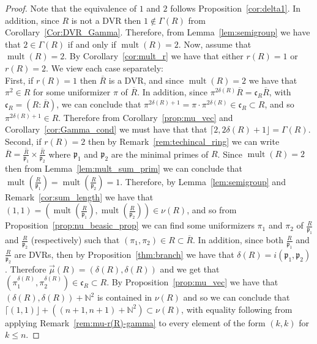 \documentclass{article}
\DeclareMathOperator{\mult}{mult}
\numberwithin{theorem}{section}
\begin{document}
\begin{proof}
    Note that the equivalence of $1$ and $2$ follows Proposition~\ref{cor:delta1}. In addition, since $R$ is not a DVR then $1 \notin \Gamma(R)$ from Corollary~\ref{Cor:DVR_Gamma}. Therefore, from Lemma~\ref{lem:semigroup} we have that $2 \in \Gamma(R)$ if and only if $\mult(R)=2$. Now, assume that $\mult(R)=2$.  By Corollary~\ref{cor:mult_r} we have that either $r(R)=1$ or $r(R)=2$. We view each case separately:  \\
    
    First, if $r(R)=1$ then $\overline{R}$ is a DVR, and since $\mult(R)=2$ we have that $\pi^2 \in R$ for some uniformizer $\pi$ of $\overline{R}$. In addition, since $\pi^{2\delta(R)} \overline{R} = \mathfrak{c}_R \overline{R}$, with $\mathfrak{c}_R = (R \colon \overline{R})$, we can conclude that $\pi^{2\delta(R)+1} = \pi \cdot \pi^{2\delta(R)}  \in \mathfrak{c}_R \subset R$, and so $\pi^{2\delta(R)+1} \in R$. Therefore from Corollary~\ref{prop:mu_vec} and Corollary~\ref{cor:Gamma_cond} we must have that that $\lceil 2, 2\delta(R)+1 \rfloor = \Gamma(R)$.  \\
    
    Second, if $r(R)=2$ then by Remark~\ref{rem:techincal_ring} we can write $\overline{R} = \overline{\frac{R}{\mathfrak{p}_1}} \times \overline{\frac{R}{\mathfrak{p}_2}}$ where $\mathfrak{p}_1$ and $\mathfrak{p}_2$ are the minimal primes of $R$. Since $\mult(R)=2$ then from Lemma~\ref{lem:mult_sum_prim} we can conclude that $\mult\left(\frac{R}{\mathfrak{p}_1}\right) = \mult\left(\frac{R}{\mathfrak{p}_2}\right)=1$. Therefore, by Lemma~\ref{lem:semigroup} and Remark~\ref{cor:sum_length} we have that  $(1,1)=\left(\mult\left(\frac{R}{\mathfrak{p}_1}\right), \mult\left(\frac{R}{\mathfrak{p}_2}\right)\right) \in \nu(R)$, and so from Proposition~\ref{prop:nu_beasic_prop} we can find some uniformizers $\pi_1$ and $\pi_2$ of $\frac{R}{\mathfrak{p}_1}$ and $\frac{R}{\mathfrak{p}_2}$ (respectively) such that $(\pi_1, \pi_2) \in R \subset \overline{R}$. In addition, since both $\frac{R}{\mathfrak{p}_1}$ and $\frac{R}{\mathfrak{p}_2}$ are DVRs, then by Proposition~\ref{thm:branch} we have that $\delta(R)=i(\mathfrak{p}_1, \mathfrak{p}_2)$. Therefore $\vec{\mu}(R)=(\delta(R), \delta(R))$ and we get that $(\pi_1^{\delta(R)}, \pi_2^{\delta(R)}) \in \mathfrak{c}_R \subset R$. By Proposition~\ref{prop:mu_vec} we have that $(\delta(R),\delta(R)) + \mathbb{N}^2$ is contained in $\nu(R)$ and so we can conclude  that $\lceil (1,1)\rfloor + ((n+1, n+1) + \mathbb{N}^2) \subset \nu(R)$, with equality following from applying Remark~\ref{rem:mu-r(R)-gamma} to every element of the form $(k,k)$ for $k \leq n$.  
\end{proof}
\end{document}
